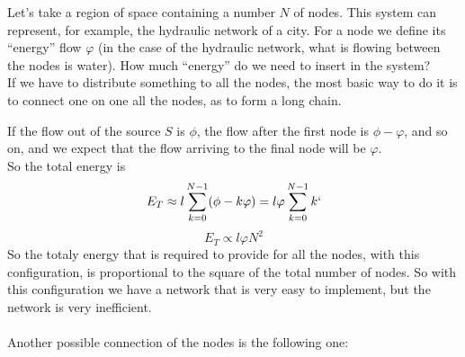 Let's take a region of space containing a number $N$ of nodes. This system can represent, for example, the hydraulic network of a city. 
For a node we define its ``energy'' flow $\varphi$ (in the case of the hydraulic network, what is flowing between the nodes is water). How much ``energy'' do we need to insert in the system? \\
If we have to distribute something to all the nodes, the most basic way to do it is to connect one on one all the nodes, as to form a long chain. \\
\begin{center}
\end{center}
If the flow out of the source $S$ is $\phi$, the flow after the first node is $\phi - \varphi$, and so on, and we expect that the flow arriving to the final node will be $\varphi$. \\
So the total energy is 
$$
	E_T \approx l\sum_{k=0}^{N-1} (\phi - k\varphi) = l\varphi\sum_{k=0}^{N-1} k`
$$
$$
	E_T \propto l\varphi N^2
$$
So the totaly energy that is required to provide for all the nodes, with this configuration, is proportional to the square of the total number of nodes. So with this configuration we have a network that is very easy to implement, but the network is very inefficient. \\ \\ 
Another possible connection of the nodes is the following one:
\begin{center}
\end{center}
